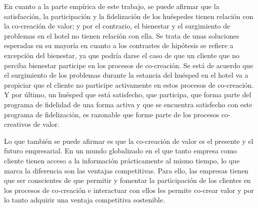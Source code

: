 En cuanto a la parte empírica de este trabajo, se puede afirmar que la satisfacción, la participación y la fidelización de los huéspedes tienen relación con la co-creación de valor; y por el contrario, el bienestar y el surgimiento de problemas en el hotel no tienen relación con ella. Se trata de unas soluciones esperadas en su mayoría en cuanto a los contrastes de hipótesis se refiere a excepción del bienestar, ya que podría darse el caso de que un cliente que no perciba bienestar participe en los procesos de co-creación. Se está de acuerdo que el surgimiento de los problemas durante la estancia del huésped en el hotel va a propiciar que el cliente no participe activamente en estos procesos de co-creación. Y por último,  un huésped que está satisfecho, que participa, que forma parte del programa de fidelidad de una forma activa y que se encuentra satisfecho con este programa de fidelización, es razonable que forme parte de los procesos co-creativos de valor.

Lo que también se puede afirmar es que la co-creación de valor es el presente y el futuro empresarial. En un mundo globalizado en el que tanto empresa como cliente tienen acceso a la información prácticamente al mismo tiempo, lo que marca la diferencia son las ventajas competitivas. Para ello, las empresas tienen que ser conscientes de que permitir y fomentar la participación de los clientes en los procesos de co-creación e interactuar con ellos les permite co-crear valor y por lo tanto adquirir una ventaja competitiva sostenible.
